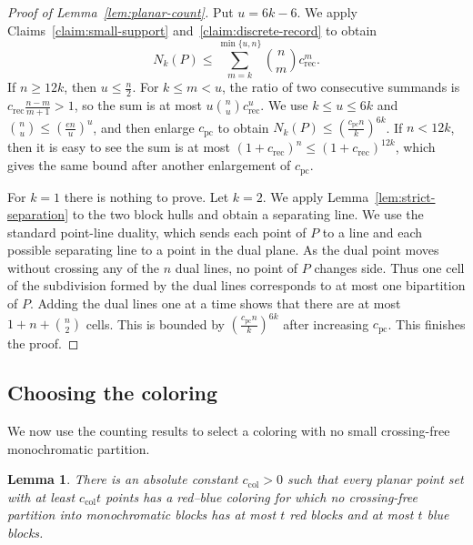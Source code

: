 \documentclass[11pt]{article}
\newtheorem{lemma}[theorem]{Lemma}
\theoremstyle{definition}
\begin{document}
\begin{proof}[Proof of Lemma~\ref{lem:planar-count}]
Put \(u=6k-6\). We apply Claims~\ref{claim:small-support} and~\ref{claim:discrete-record} to obtain
\[
N_{k}(P)\le\sum_{m=k}^{\min\{u,n\}}\binom{n}{m}c_{\mathrm{rec}}^{m}.
\]
If \(n\ge12k\), then \(u\le\frac{n}{2}\). For \(k\le m<u\), the ratio of two consecutive summands is \(c_{\mathrm{rec}}\frac{n-m}{m+1}>1\), so the sum is at most \(u\binom{n}{u}c_{\mathrm{rec}}^{u}\). We use \(k\le u\le6k\) and \(\binom{n}{u}\le(\frac{en}{u})^{u}\), and then enlarge \(c_{\mathrm{pc}}\) to obtain \(N_{k}(P)\le(\frac{c_{\mathrm{pc}}n}{k})^{6k}\). If \(n<12k\), then it is easy to see the sum is at most \((1+c_{\mathrm{rec}})^{n}\le(1+c_{\mathrm{rec}})^{12k}\), which gives the same bound after another enlargement of \(c_{\mathrm{pc}}\).

For \(k=1\) there is nothing to prove. Let \(k=2\). We apply Lemma~\ref{lem:strict-separation} to the two block hulls and obtain a separating line. We use the standard point-line duality, which sends each point of \(P\) to a line and each possible separating line to a point in the dual plane. As the dual point moves without crossing any of the \(n\) dual lines, no point of \(P\) changes side. Thus one cell of the subdivision formed by the dual lines corresponds to at most one bipartition of \(P\). Adding the dual lines one at a time shows that there are at most \(1+n+\binom{n}{2}\) cells. This is bounded by \((\frac{c_{\mathrm{pc}}n}{k})^{6k}\) after increasing \(c_{\mathrm{pc}}\). This finishes the proof.
\end{proof}

\subsection{Choosing the coloring}

We now use the counting results to select a coloring with no small crossing-free monochromatic partition.

\begin{lemma}\label{lem:planar-coloring}
There is an absolute constant \(c_{\mathrm{col}}>0\) such that every planar point set with at least \(c_{\mathrm{col}}t\) points has a red--blue coloring for which no crossing-free partition into monochromatic blocks has at most \(t\) red blocks and at most \(t\) blue blocks.
\end{lemma}
\end{document}

